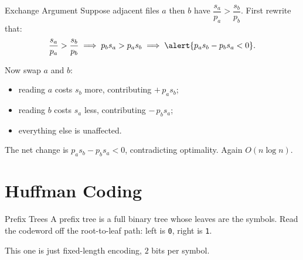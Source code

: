 \documentclass[10pt,aspectratio=169]{beamer}
\begin{document}
\begin{frame}{Exchange Argument}
  Suppose adjacent files $a$ then $b$ have
  $\dfrac{s_a}{p_a} > \dfrac{s_b}{p_b}$. First rewrite that:
  \[
    \frac{s_a}{p_a} > \frac{s_b}{p_b}
    \;\Longrightarrow\;
    p_b s_a > p_a s_b
    \;\Longrightarrow\;
    \alert{p_a s_b - p_b s_a < 0}.
  \]

  \pause
  \bigskip
  Now swap $a$ and $b$:
  \begin{itemize}
    \item reading $a$ costs $s_b$ more, contributing $+\, p_a s_b$;
    \item reading $b$ costs $s_a$ less, contributing $-\, p_b s_a$;
    \item everything else is unaffected.
  \end{itemize}

  \pause
  \bigskip
  The net change is $p_a s_b - p_b s_a < 0$, contradicting optimality.
  Again $O(n \log n)$.
\end{frame}

\section{Huffman Coding}

\begin{frame}{Prefix Trees}
  A \alert{prefix tree} is a full binary tree whose leaves are the symbols.
  Read the codeword off the root-to-leaf path: left is \texttt{0}, right is
  \texttt{1}.

  \bigskip
  \begin{center}
  \end{center}

  \bigskip
  \begin{center}
    This one is just fixed-length encoding, $2$ bits per symbol.
  \end{center}
\end{frame}
\end{document}
